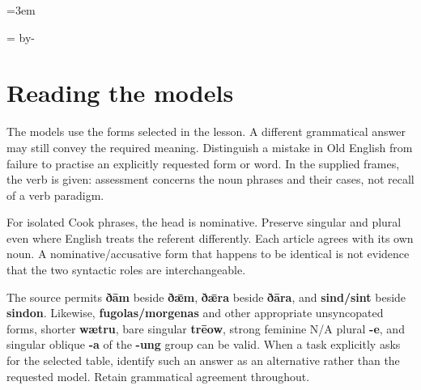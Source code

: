 \BookRecto
\begingroup
\renewcommand{\runningtitle}{Unit 1. Answer key}
\emergencystretch=3em
\newcommand{\reserve}[1]{\par\penalty-100\begingroup\dimen0=\pagegoal\advance\dimen0 by-\pagetotal\ifdim\dimen0<#1\newpage\fi\endgroup}
\newcommand{\itempara}[2]{\par\addvspace{3pt}\begingroup\raggedright\noindent\hangindent=1.8em\hangafter=1\makebox[1.8em][l]{#1.}#2\par\endgroup}

\raggedright
{}

\reserve{4\baselineskip}
\section*{Reading the models}

The models use the forms selected in the lesson. A different grammatical answer may still convey the required meaning. Distinguish a mistake in Old English from failure to practise an explicitly requested form or word. In the supplied frames, the verb is given: assessment concerns the noun phrases and their cases, not recall of a verb paradigm.

For isolated Cook phrases, the head is nominative. Preserve singular and plural even where English treats the referent differently. Each article agrees with its own noun. A nominative/\allowbreak{}accusative form that happens to be identical is not evidence that the two syntactic roles are interchangeable.

The source permits \textbf{ðām} beside \textbf{ðǣm}, \textbf{ðǣra} beside \textbf{ðāra}, and \textbf{sind/\allowbreak{}sint} beside \textbf{sindon}. Likewise, \textbf{fugolas/\allowbreak{}morgenas} and other appropriate unsyncopated forms, shorter \textbf{wætru}, bare singular \textbf{trēow}, strong feminine N/\allowbreak{}A plural \textbf{-e}, and singular oblique \textbf{-a} of the \textbf{-ung} group can be valid. When a task explicitly asks for the selected table, identify such an answer as an alternative rather than the requested model. Retain grammatical agreement throughout.

